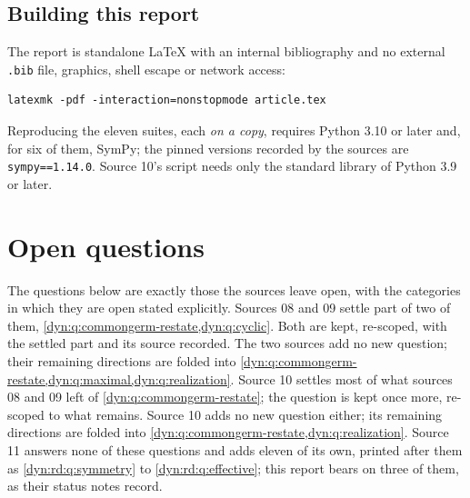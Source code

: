 \documentclass[11pt,letterpaper]{article}
\theoremstyle{definition}
\theoremstyle{remark}
\numberwithin{equation}{section}
\begin{document}
\subsection{Building this report}
The report is standalone LaTeX with an internal bibliography and no
external \texttt{.bib} file, graphics, shell escape or network access:
\begin{verbatim}
latexmk -pdf -interaction=nonstopmode article.tex
\end{verbatim}
Reproducing the eleven suites, each \emph{on a copy}, requires Python 3.10
or later and, for six of them, SymPy; the pinned versions recorded by the
sources are \texttt{sympy==1.14.0}. Source 10's script needs only the
standard library of Python 3.9 or later.

\section{Open questions}
\label{dyn:sec:questions}

The questions below are exactly those the sources leave open, with the
categories in which they are open stated explicitly. Sources 08 and 09
settle part of two of them, \cref{dyn:q:commongerm-restate,dyn:q:cyclic}.
Both are kept, re-scoped, with the settled part and its source recorded.
The two sources add no new question; their remaining directions are folded
into \cref{dyn:q:commongerm-restate,dyn:q:maximal,dyn:q:realization}.
Source 10 settles most of what sources 08 and 09 left of
\cref{dyn:q:commongerm-restate}; the question is kept once more, re-scoped
to what remains. Source 10 adds no new question either; its remaining
directions are folded into \cref{dyn:q:commongerm-restate,dyn:q:realization}.
Source 11 answers none of these questions and adds eleven of its own,
printed after them as \cref{dyn:rd:q:symmetry} to
\cref{dyn:rd:q:effective}; this report bears on three of them, as their
status notes record.
\end{document}
